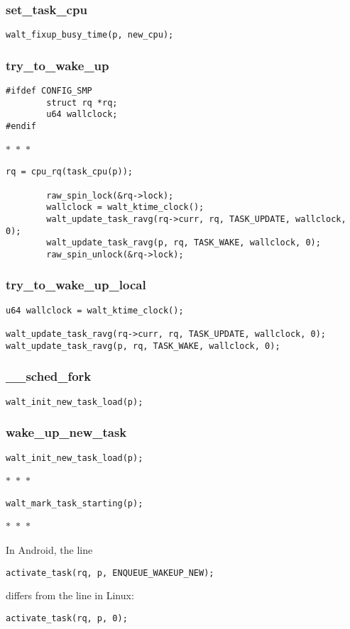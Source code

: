 \documentclass{article}
\newcommand{\divider}{{\begin{center}
  $\ast$~$\ast$~$\ast$
\end{center}}}
\begin{document}
\subsubsection{set\_task\_cpu}

\begin{verbatim}
walt_fixup_busy_time(p, new_cpu);
\end{verbatim}

\subsubsection{try\_to\_wake\_up}

\begin{verbatim}
#ifdef CONFIG_SMP
        struct rq *rq;
        u64 wallclock;
#endif
\end{verbatim}
\divider
\begin{verbatim}
rq = cpu_rq(task_cpu(p));

        raw_spin_lock(&rq->lock);
        wallclock = walt_ktime_clock();
        walt_update_task_ravg(rq->curr, rq, TASK_UPDATE, wallclock, 0);
        walt_update_task_ravg(p, rq, TASK_WAKE, wallclock, 0);
        raw_spin_unlock(&rq->lock);
\end{verbatim}

\subsubsection{try\_to\_wake\_up\_local}

\begin{verbatim}
u64 wallclock = walt_ktime_clock();

walt_update_task_ravg(rq->curr, rq, TASK_UPDATE, wallclock, 0);
walt_update_task_ravg(p, rq, TASK_WAKE, wallclock, 0);
\end{verbatim}

\subsubsection{\_\_sched\_fork}

\begin{verbatim}
walt_init_new_task_load(p);
\end{verbatim}

\subsubsection{wake\_up\_new\_task}

\begin{verbatim}
walt_init_new_task_load(p);
\end{verbatim}
\divider
\begin{verbatim}
walt_mark_task_starting(p);
\end{verbatim}
\divider
In Android, the line
\begin{verbatim}
activate_task(rq, p, ENQUEUE_WAKEUP_NEW);
\end{verbatim}
differs from the line in Linux:
\begin{verbatim}
activate_task(rq, p, 0);
\end{verbatim}
\end{document}
